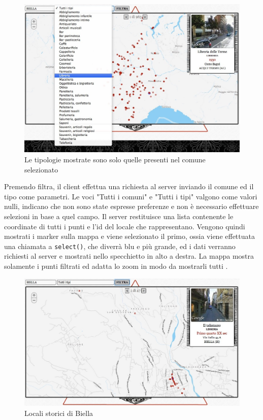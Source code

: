 \begin{figure}[ht!]
	\caption{Le tipologie mostrate sono solo quelle presenti nel comune selezionato}
	\centering
		\includegraphics[width=\textwidth]{img/s4.jpg}
\end{figure}

Premendo filtra, il client effettua una richiesta al server inviando il comune ed il tipo come parametri. Le voci "Tutti i comuni" e "Tutti i tipi" valgono come valori nulli, indicano che non sono state espresse preferenze e non è necessario effettuare selezioni in base a quel campo. Il server restituisce una lista contenente le coordinate di tutti i punti e l'id del locale che rappresentano. Vengono quindi mostrati i marker sulla mappa e viene selezionato il primo, ossia viene effettuata una chiamata a \texttt{select()}, che diverrà blu e più grande, ed i dati verranno richiesti al server e mostrati nello specchietto in alto a destra. La mappa mostra solamente i punti filtrati ed adatta lo zoom in modo da mostrarli tutti .

\begin{figure}[ht!]
	\caption{Locali storici di Biella}
	\centering
		\includegraphics[width=\textwidth]{img/s5.jpg}
\end{figure}

